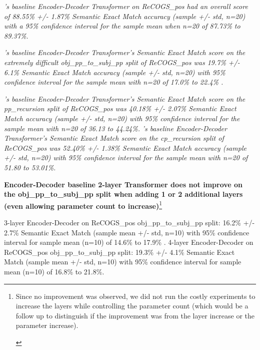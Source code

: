 \documentclass[11pt]{article}
\begin{document}
\textit{\cite{Wu2023}'s baseline Encoder-Decoder Transformer on ReCOGS\_pos had an overall score of  88.55\% +/- 1.87\% Semantic Exact Match accuracy (sample +/- std, n=20) with a 95\% confidence interval for the sample mean when n=20 of 87.73\% to 89.37\%.}

\textit{\cite{Wu2023}'s baseline Encoder-Decoder Transformer's Semantic Exact Match score on the extremely difficult obj\_pp\_to\_subj\_pp split of ReCOGS\_pos was 19.7\% +/- 6.1\% Semantic Exact Match accuracy (sample +/- std, n=20) with 95\% confidence interval for the sample mean with n=20 of 17.0\% to 22.4\% .}

\textit{\cite{Wu2023}'s baseline Encoder-Decoder Transformer's Semantic Exact Match score on the pp\_recursion split of ReCOGS\_pos was 40.18\% +/- 2.07\% Semantic Exact Match accuracy (sample +/- std, n=20) with 95\% confidence interval for the sample mean with n=20 of 36.13 to 44.24\%.} \textit{\cite{Wu2023}'s baseline Encoder-Decoder Transformer's Semantic Exact Match score on the cp\_recursion split of ReCOGS\_pos was 52.40\% +/- 1.38\% Semantic Exact Match accuracy (sample +/- std, n=20) with 95\% confidence interval for the sample mean with n=20 of 51.80 to 53.01\%.}

\textbf{\cite{Wu2023} Encoder-Decoder baseline 2-layer Transformer does not improve on the obj\_pp\_to\_subj\_pp split when adding 1 or 2 additional layers}
\label{wu-baseline-layer-variation-experiment-results}
\textbf{(even allowing parameter count to increase)}\footnote{\begin{footnotesize}
Since no improvement was observed, we did not run the costly experiments to increase the layers while controlling the parameter count (which would be a follow up to distinguish if the improvement was from the layer increase or the parameter increase).
\end{footnotesize}
}

3-layer \cite{Wu2023} Encoder-Decoder on ReCOGS\_pos obj\_pp\_to\_subj\_pp split: 16.2\% +/- 2.7\% Semantic Exact Match (sample mean +/- std, n=10) with 95\% confidence interval for sample mean (n=10) of 14.6\% to 17.9\% . 4-layer \cite{Wu2023} Encoder-Decoder on ReCOGS\_pos obj\_pp\_to\_subj\_pp split: 19.3\% +/- 4.1\% Semantic Exact Match (sample mean +/- std, n=10) with 95\% confidence interval for sample mean (n=10) of 16.8\% to 21.8\%.
\end{document}

